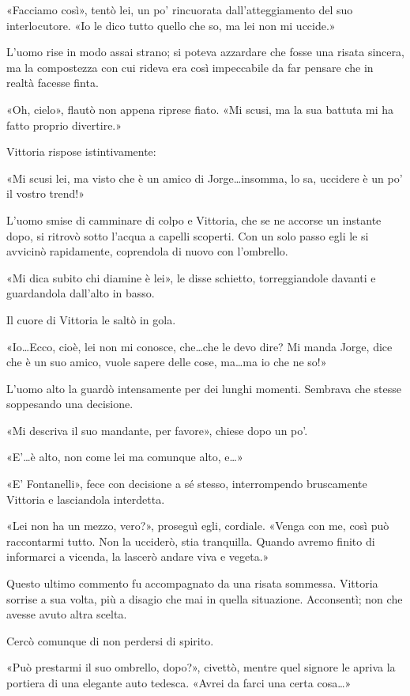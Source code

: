 «Facciamo così», tentò lei, un po' rincuorata dall'atteggiamento del suo interlocutore. «Io le dico tutto quello che so, ma lei non mi uccide.»

L'uomo rise in modo assai strano; si poteva azzardare che fosse una risata sincera, ma la compostezza con cui rideva era così impeccabile da far pensare che in realtà facesse finta.

«Oh, cielo», flautò non appena riprese fiato. «Mi scusi, ma la sua battuta mi ha fatto proprio divertire.»

Vittoria rispose istintivamente:

«Mi scusi lei, ma visto che è un amico di Jorge\ldots insomma, lo sa, uccidere è un po' il vostro trend!»

L'uomo smise di camminare di colpo e Vittoria, che se ne accorse un instante dopo, si ritrovò sotto l'acqua a capelli scoperti. Con un solo passo egli le si avvicinò rapidamente, coprendola di nuovo con l'ombrello.

«Mi dica subito chi diamine è lei», le disse schietto, torreggiandole davanti e guardandola dall'alto in basso.

Il cuore di Vittoria le saltò in gola.

«Io\ldots Ecco, cioè, lei non mi conosce, che\ldots che le devo dire? Mi manda Jorge, dice che è un suo amico, vuole sapere delle cose, ma\ldots ma io che ne so!»

L'uomo alto la guardò intensamente per dei lunghi momenti. Sembrava che stesse soppesando una decisione.

«Mi descriva il suo mandante, per favore», chiese dopo un po'.

«E'\ldots è alto, non come lei ma comunque alto, e\ldots»

«E' Fontanelli», fece con decisione a sé stesso, interrompendo bruscamente Vittoria e lasciandola interdetta.

«Lei non ha un mezzo, vero?», proseguì egli, cordiale. «Venga con me, così può raccontarmi tutto. Non la ucciderò, stia tranquilla. Quando avremo finito di informarci a vicenda, la lascerò andare viva e vegeta.»

Questo ultimo commento fu accompagnato da una risata sommessa. Vittoria sorrise a sua volta, più a disagio che mai in quella situazione. Acconsentì; non che avesse avuto altra scelta.

Cercò comunque di non perdersi di spirito.

«Può prestarmi il suo ombrello, dopo?», civettò, mentre quel signore le apriva la portiera di una elegante auto tedesca. «Avrei da farci una certa cosa\ldots»

